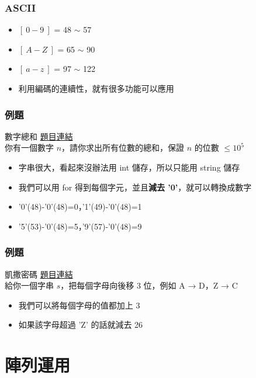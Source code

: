 \documentclass[mathserif]{beamer}
\begin{document}
\begin{frame}
    \frametitle{ASCII}
    \begin{itemize}
        \item $[\ 0-9\ ]$ = 48 $\sim$ 57
        \item $[\ A-Z\ ]$ = 65 $\sim$ 90
        \item $[\ a-z\ ]$ = 97 $\sim$ 122
        \item 利用編碼的連續性，就有很多功能可以應用
    \end{itemize}
\end{frame}

\begin{frame}
    \frametitle{例題}
    \begin{block}{數字總和}
        \href{https://codeforces.com/group/S6XjkGb6qB/contest/403070/problem/C}{題目連結}\\
        你有一個數字 $n$，請你求出所有位數的總和，保證 $n$ 的位數 $\leq 10^5$
    \end{block}
    \begin{itemize}
        \item<2-> 字串很大，看起來沒辦法用 int 儲存，所以只能用 string 儲存
        \item<2-> 我們可以用 for 得到每個字元，並且\textbf{減去 '0'}，就可以轉換成數字
        \item<2-> '0'(48)-'0'(48)=0，'1'(49)-'0'(48)=1
        \item<2-> '5'(53)-'0'(48)=5，'9'(57)-'0'(48)=9
    \end{itemize}
\end{frame}

\begin{frame}
    \frametitle{例題}
    \begin{block}{凱撒密碼}
        \href{https://zerojudge.tw/ShowProblem?problemid=b516}{題目連結}\\
        給你一個字串 $s$，把每個字母向後移 3 位，例如 A → D，Z → C
    \end{block}
    \begin{itemize}
        \item<2-> 我們可以將每個字母的值都加上 3
        \item<2-> 如果該字母超過 'Z' 的話就減去 26
    \end{itemize}
\end{frame}

\section{陣列運用}
\end{document}
